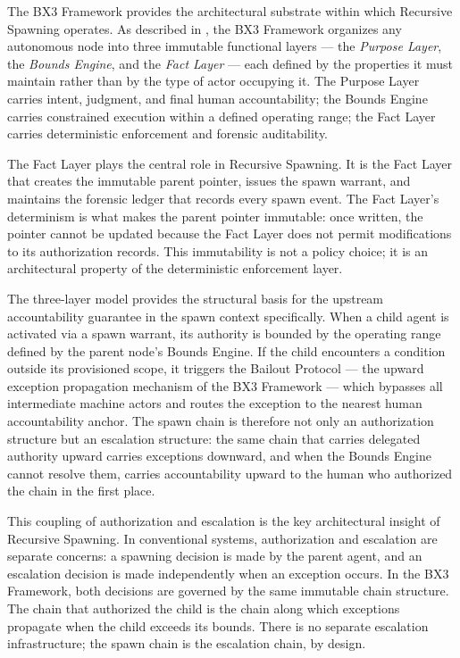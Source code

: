 The BX3 Framework provides the architectural substrate within which Recursive Spawning operates. As described in \cite{bx3framework2026}, the BX3 Framework organizes any autonomous node into three immutable functional layers --- the \textit{Purpose Layer}, the \textit{Bounds Engine}, and the \textit{Fact Layer} --- each defined by the properties it must maintain rather than by the type of actor occupying it. The Purpose Layer carries intent, judgment, and final human accountability; the Bounds Engine carries constrained execution within a defined operating range; the Fact Layer carries deterministic enforcement and forensic auditability.

The Fact Layer plays the central role in Recursive Spawning. It is the Fact Layer that creates the immutable parent pointer, issues the spawn warrant, and maintains the forensic ledger that records every spawn event. The Fact Layer's determinism is what makes the parent pointer immutable: once written, the pointer cannot be updated because the Fact Layer does not permit modifications to its authorization records. This immutability is not a policy choice; it is an architectural property of the deterministic enforcement layer.

The three-layer model provides the structural basis for the upstream accountability guarantee in the spawn context specifically. When a child agent is activated via a spawn warrant, its authority is bounded by the operating range defined by the parent node's Bounds Engine. If the child encounters a condition outside its provisioned scope, it triggers the Bailout Protocol \cite{bailoutprotocol2026} --- the upward exception propagation mechanism of the BX3 Framework --- which bypasses all intermediate machine actors and routes the exception to the nearest human accountability anchor. The spawn chain is therefore not only an authorization structure but an escalation structure: the same chain that carries delegated authority upward carries exceptions downward, and when the Bounds Engine cannot resolve them, carries accountability upward to the human who authorized the chain in the first place.

This coupling of authorization and escalation is the key architectural insight of Recursive Spawning. In conventional systems, authorization and escalation are separate concerns: a spawning decision is made by the parent agent, and an escalation decision is made independently when an exception occurs. In the BX3 Framework, both decisions are governed by the same immutable chain structure. The chain that authorized the child is the chain along which exceptions propagate when the child exceeds its bounds. There is no separate escalation infrastructure; the spawn chain is the escalation chain, by design.

